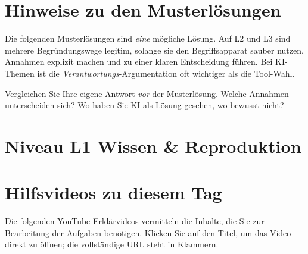 \documentclass[11pt,a4paper,oneside]{article}
\begin{document}
\section*{Hinweise zu den Musterlösungen}
\thispagestyle{plain}

\noindent Die folgenden Musterlösungen sind \emph{eine} mögliche Lösung. Auf L2 und L3 sind mehrere Begründungswege legitim, solange sie den Begriffsapparat sauber nutzen, Annahmen explizit machen und zu einer klaren Entscheidung führen. Bei KI-Themen ist die \emph{Verantwortungs}-Argumentation oft wichtiger als die Tool-Wahl.

\begin{infobox}
Vergleichen Sie Ihre eigene Antwort \emph{vor} der Musterlösung. Welche Annahmen unterscheiden sich? Wo haben Sie KI als Lösung gesehen, wo bewusst nicht?
\end{infobox}

\clearpage

\section*{Niveau L1 \textendash{} Wissen \& Reproduktion}

\section*{Hilfsvideos zu diesem Tag}
\thispagestyle{plain}

\noindent Die folgenden YouTube-Erkl\"arvideos vermitteln die Inhalte, die Sie zur Bearbeitung der Aufgaben ben\"otigen. Klicken Sie auf den Titel, um das Video direkt zu \"offnen; die vollst\"andige URL steht in Klammern.
\end{document}
